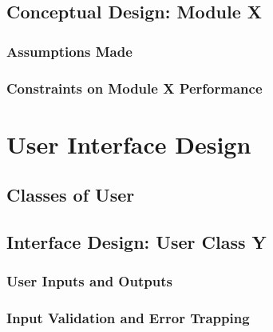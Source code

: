 \documentclass[10pt,a4paper]{report}
\begin{document}
\section{Conceptual Design: Module X}
\subsection{Assumptions Made}
\subsection{Constraints on Module X Performance}

\chapter{User Interface Design}
\section{Classes of User}
\section{Interface Design: User Class Y}
\subsection{User Inputs and Outputs}
\subsection{Input Validation and Error Trapping}
\end{document}
